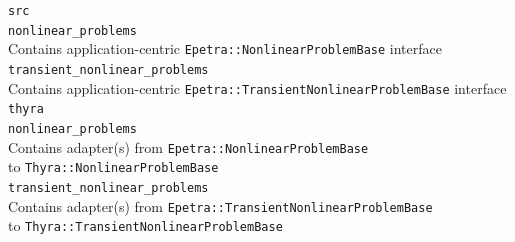 \documentclass[pdf,ps2pdf,11pt]{SANDreport}
\begin{document}
\>\>\texttt{src} \\
\>\>\>\texttt{nonlinear\_problems} \\
\>\>\>\>Contains application-centric \texttt{Epetra::NonlinearProblemBase} interface \\
\>\>\>\texttt{transient\_nonlinear\_problems} \\
\>\>\>\>Contains application-centric \texttt{Epetra::TransientNonlinearProblemBase} interface \\
\>\>\>\texttt{thyra} \\
\>\>\>\>\texttt{nonlinear\_problems} \\
\>\>\>\>\>Contains adapter(s) from \texttt{Epetra::NonlinearProblemBase} \\
\>\>\>\>\>to \texttt{Thyra::NonlinearProblemBase} \\
\>\>\>\>\texttt{transient\_nonlinear\_problems} \\
\>\>\>\>\>Contains adapter(s) from \texttt{Epetra::TransientNonlinearProblemBase}\\
\>\>\>\>\>to \texttt{Thyra::TransientNonlinearProblemBase} \\
\eifthen

\end{document}

